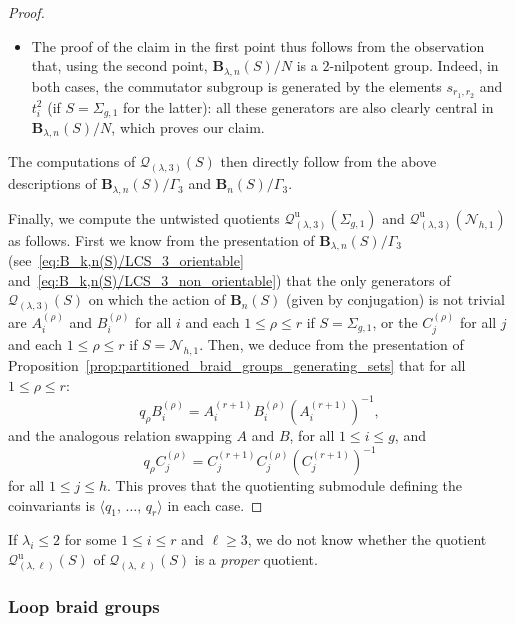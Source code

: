 \documentclass[AHL,Unicode,published]{cedram}
\newcommand{\unt}{\mathrm{u}}
\newcommand{\B}{\ensuremath{\mathbf{B}}}
\newcommand{\LCS}{\varGamma}
\newcommand{\N}{\mathscr{N}}
\newcommand{\cQ}{\mathcal{Q}}
\renewcommand{\geq}{\geqslant}
\renewcommand{\leq}{\leqslant}
\begin{document}
\begin{proof}
\begin{itemize}
\item The proof of the claim in the first point thus follows from the observation that, using the second point, $\B_{\lambda,n}(S)/N$ is a $2$-nilpotent group. Indeed, in both cases, the commutator subgroup is generated by the elements $s_{r_{1},r_{2}}$ and $t_{i}^{2}$ (if $S=\Sigma_{g,1}$ for the latter): all these generators are also clearly central in $\B_{\lambda,n}(S)/N$, which proves our claim.
\end{itemize}
The computations of $\cQ_{(\lambda,3)}(S)$ then directly follow from the above descriptions of $\B_{\lambda,n}(S)/\LCS_{3}$ and $\B_{n}(S)/\LCS_{3}$.

Finally, we compute the untwisted quotients $\cQ^{\unt}_{(\lambda,3)}(\Sigma_{g,1})$ and $\cQ^{\unt}_{(\lambda,3)}(\N_{h,1})$ as follows. First we know from the presentation of $\B_{\lambda,n}(S)/\LCS_{3}$ (see~\eqref{eq:B_k,n(S)/LCS_3_orientable} and~\eqref{eq:B_k,n(S)/LCS_3_non_orientable}) that the only generators of $\cQ_{(\lambda,3)}(S)$ on which the action of $\B_{n}(S)$ (given by conjugation) is not trivial are $A_{i}^{(\rho)}$ and $B_{i}^{(\rho)}$ for all $i$ and each $1\leq\rho\leq r$ if $S=\Sigma_{g,1}$, or the $C_{j}^{(\rho)}$ for all $j$ and each $1\leq\rho\leq r$ if $S=\N_{h,1}$. Then, we deduce from the presentation of Proposition~\ref{prop:partitioned_braid_groups_generating_sets} that for all $1\leq \rho\leq r$:
\[
q_{\rho}B_{i}^{(\rho)}= A_{i}^{(r+1)} B_{i}^{(\rho)} \left(A_{i}^{(r+1)}\right)^{-1},
\]
and the analogous relation swapping $A$ and $B$, for all $1\leq i\leq g$, and
\[
q_{\rho}C_{j}^{(\rho)}= C_{j}^{(r+1)} C_{j}^{(\rho)} \left(C_{j}^{(r+1)}\right)^{-1}
\]
for all $1\leq j\leq h$. This proves that the quotienting submodule defining the coinvariants is $\langle q_{1},\,\ldots,\,q_{r}\rangle$ in each case.
\end{proof}

\begin{rema}\label{rmk:limitation_untwisted_transformation_group_surface_braid}
If $\lambda_{i} \leq 2$ for some $1\leq i\leq r$ and $\ell\geq 3$, we do not know whether the quotient $\cQ^{\unt}_{(\lambda,\ell)}(S)$ of $\cQ_{(\lambda,\ell)}(S)$ is a \emph{proper} quotient.
\end{rema}


\subsubsection{Loop braid groups}\label{ss:loop_braid_transformation_groups}
\end{document}
